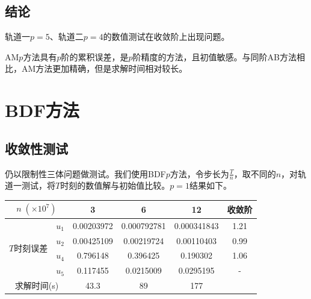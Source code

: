 \documentclass[lang=cn,10pt,bibend=bibtex]{elegantbook}
\begin{document}
\vspace{-2.5em}
\subsection{结论}
\vspace{-.8em}

轨道一$p=5$、轨道二$p=4$的数值测试在收敛阶上出现问题。

AM$p$方法具有$p$阶的累积误差，是$p$阶精度的方法，且初值敏感。与同阶AB方法相比，AM方法更加精确，但是求解时间相对较长。

\vspace{-1.5em}
\section{BDF方法}
\vspace{-1em}

\subsection{收敛性测试}
\vspace{-.8em}

仍以限制性三体问题做测试。我们使用BDF$p$方法，令步长为$\frac{T}{n}$，取不同的$n$，对轨道一测试，将$T$时刻的数值解与初始值比较。$p=1$结果如下。

\vspace{-.8em}
\begin{table}[H]
  \centering
  \renewcommand\arraystretch{0.75}
  \begin{tabular}{cc|ccc|c}
  \multicolumn{2}{c|}{$n\;(\times 10^7)$}                  & 3 & 6 & 12  & 收敛阶 \\ \hline
  \multicolumn{1}{c|}{\multirow{4}{*}{$T$时刻误差}} & \multicolumn{1}{c|}{$u_1$} & 0.00203972   &   0.000792781 & 0.000341843  &  1.21   \\
  \multicolumn{1}{c|}{}                         & \multicolumn{1}{c|}{$u_2$} &   0.00425109    & 0.00219724  & 0.00110403    &  0.99   \\
  \multicolumn{1}{c|}{}                         & \multicolumn{1}{c|}{$u_4$} &   0.796148    & 0.396425  & 0.190302     &  1.06   \\
  \multicolumn{1}{c|}{}                         & \multicolumn{1}{c|}{$u_5$} &   0.117455    & 0.0215009  & 0.0295195     &  -  \\ \hline
  \multicolumn{2}{c|}{求解时间(s)} & 43.3 & 89 & 177 & 
  \end{tabular}
\end{table}
\vspace{-1em}
\end{document}
